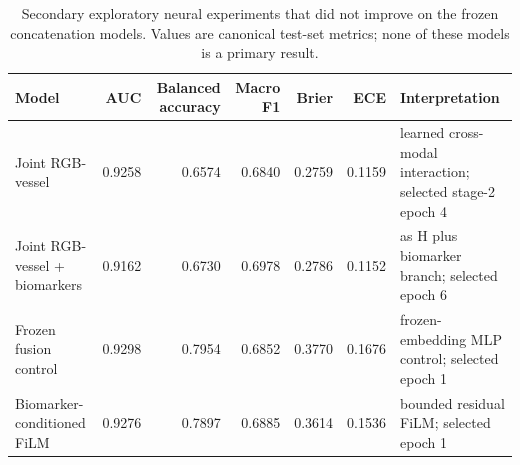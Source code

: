 \begin{table}[htbp]
\centering
\small
\caption{Secondary exploratory neural experiments that did not improve on the frozen concatenation models. Values are canonical test-set metrics; none of these models is a primary result.}
\label{tab:negative}
\begin{tabular}{p{4.6cm}rrrrrp{5.4cm}}
\toprule
Model & AUC & Balanced accuracy & Macro F1 & Brier & ECE & Interpretation \\
\midrule
Joint RGB-vessel & 0.9258 & 0.6574 & 0.6840 & 0.2759 & 0.1159 & learned cross-modal interaction; selected stage-2 epoch 4 \\
Joint RGB-vessel + biomarkers & 0.9162 & 0.6730 & 0.6978 & 0.2786 & 0.1152 & as H plus biomarker branch; selected epoch 6 \\
Frozen fusion control & 0.9298 & 0.7954 & 0.6852 & 0.3770 & 0.1676 & frozen-embedding MLP control; selected epoch 1 \\
Biomarker-conditioned FiLM & 0.9276 & 0.7897 & 0.6885 & 0.3614 & 0.1536 & bounded residual FiLM; selected epoch 1 \\
\bottomrule
\end{tabular}
\end{table}
